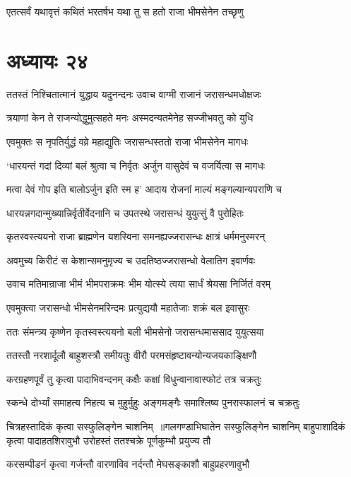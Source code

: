 \twolineshloka
{एतत्सर्वं यथावृत्तं कथितं भरतर्षभ}
{यथा तु स हतो राजा भीमसेनेन तच्छृणु}


\chapter{अध्यायः २४}
\twolineshloka
{ततस्तं निश्चितात्मानं युद्धाय यदुनन्दनः}
{उवाच वाग्मी राजानं जरासन्धमधोक्षजः}


\twolineshloka
{त्रयाणां केन ते राजन्योद्धुमुत्सहते मनः}
{अस्मदन्यतमेनेह सज्जीभवतु को युधि}


\twolineshloka
{एवमुक्तः स नृपतिर्युद्धं वव्रे महाद्युतिः}
{जरासन्धस्ततो राजा भीमसेनेन मागधः}


\twolineshloka
{`धारयन्तं गदां दिव्यां बलं श्रुत्वा च निर्वृतः}
{अर्जुन वासुदेवं च वजर्यित्वा स मागधः}


\twolineshloka
{मत्वा देवं गोप इति बालोऽर्जुन इति स्म ह'}
{आदाय रोजनां माल्यं मङ्गल्यान्यपराणि च}


\twolineshloka
{धारयन्नगदान्मुख्यान्निर्वृतीर्वेदनानि च}
{उपतस्थे जरासन्धं युयुत्सुं वै पुरोहितः}


\twolineshloka
{कृतस्वस्त्ययनो राजा ब्राह्मणेन यशस्विना}
{समनह्यज्जरासन्धः क्षात्रं धर्ममनुस्मरन्}


\twolineshloka
{अवमुच्य किरीटं स केशान्समनुमृज्य च}
{उदतिष्ठज्जरासन्धो वेलातिग इवार्णवः}


\twolineshloka
{उवाच मतिमान्राजा भीमं भीमपराक्रमः}
{भीम योत्स्ये त्वया सार्धं श्रेयसा निर्जितं वरम्}


\twolineshloka
{एवमुक्त्वा जरासन्धो भीमसेनमरिन्दमः}
{प्रत्युद्ययौ महातेजाः शक्रं बल इवासुरः}


\twolineshloka
{ततः संमन्त्र्य कृष्णेन कृतस्वस्त्ययनो बली}
{भीमसेनो जरासन्धमाससाद युयुत्सया}


\twolineshloka
{ततस्तौ नरशार्दूलौ बाहुशस्त्रौ समीयतुः}
{वीरौ परमसंहृष्टावन्योन्यजयकाङ्क्षिणौ}


\twolineshloka
{करग्रहणपूर्वं तु कृत्वा पादाभिवन्दनम्}
{कक्षैः कक्षां विधुन्वानावास्फोटं तत्र चक्रतुः}


\threelineshloka
{स्कन्धे दोर्भ्यां समाहत्य निहत्य च मुहुर्मुहुः}
{अङ्गमङ्गैः समाश्लिष्य पुनरास्फालनं च चक्रतुः}
{}


चित्रहस्तादिकं कृत्वा सस्फुलिङ्गेन चाशनिम् ॥गलगण्डाभिघातेन सस्फुलिङ्गेन चाशनिम्
\twolineshloka
{बाहुपाशादिकं कृत्वा पादाहतशिरावुभौ}
{उरोहस्तं ततश्चक्रे पूर्णकुम्भौ प्रयुज्य तौ}


\twolineshloka
{करसम्पीडनं कृत्वा गर्जन्तौ वारणाविव}
{नर्दन्तौ मेघसङ्काशौ बाहुप्रहरणावुभौ}



